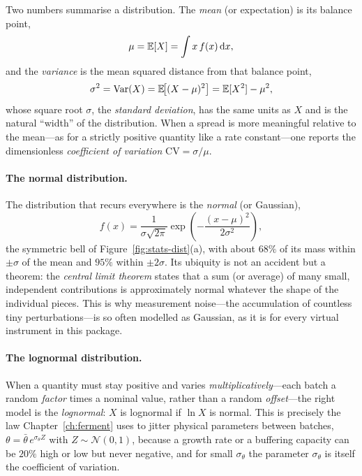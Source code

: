 Two numbers summarise a distribution. The \emph{mean} (or expectation) is its
balance point,
%
\begin{equation}
\mu = \mathbb{E}[X] = \int x\,f(x)\,\mathrm{d} x,
\end{equation}
%
and the \emph{variance} is the mean squared distance from that balance point,
%
\begin{equation}
\sigma^2 = \operatorname{Var}(X) = \mathbb{E}\!\bigl[(X-\mu)^2\bigr]
        = \mathbb{E}[X^2]-\mu^2,
\label{eq:variance}
\end{equation}
%
whose square root $\sigma$, the \emph{standard deviation}, has the same units as
$X$ and is the natural ``width'' of the distribution. When a spread is more
meaningful relative to the mean---as for a strictly positive quantity like a rate
constant---one reports the dimensionless \emph{coefficient of variation}
$\mathrm{CV}=\sigma/\mu$.

\paragraph{The normal distribution.}
The distribution that recurs everywhere is the \emph{normal} (or Gaussian),
%
\begin{equation}
f(x) = \frac{1}{\sigma\sqrt{2\pi}}
       \exp\!\left(-\frac{(x-\mu)^2}{2\sigma^2}\right),
\label{eq:normal}
\end{equation}
%
the symmetric bell of Figure~\ref{fig:stats-dist}(a), with about $68\%$ of its
mass within $\pm\sigma$ of the mean and $95\%$ within $\pm2\sigma$. Its
ubiquity is not an accident but a theorem: the \emph{central limit theorem}
states that a sum (or average) of many small, independent contributions is
approximately normal whatever the shape of the individual pieces. This is why
measurement noise---the accumulation of countless tiny perturbations---is so
often modelled as Gaussian, as it is for every virtual instrument in this
package.

\paragraph{The lognormal distribution.}
When a quantity must stay positive and varies \emph{multiplicatively}---each
batch a random \emph{factor} times a nominal value, rather than a random
\emph{offset}---the right model is the \emph{lognormal}: $X$ is lognormal if
$\ln X$ is normal. This is precisely the law Chapter~\ref{ch:ferment} uses to
jitter physical parameters between batches, $\theta = \bar\theta\,
e^{\sigma_\theta Z}$ with $Z\sim\mathcal N(0,1)$, because a growth rate or a
buffering capacity can be $20\%$ high or low but never negative, and for small
$\sigma_\theta$ the parameter $\sigma_\theta$ is itself the coefficient of
variation.

